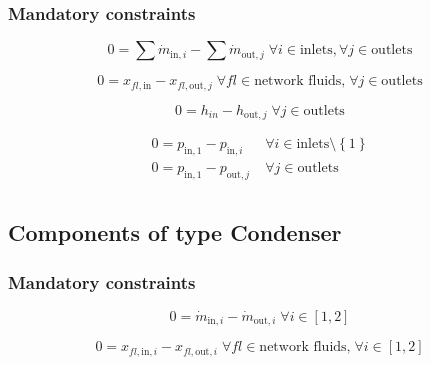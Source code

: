 \subsubsection{Mandatory constraints}

\begin{equation}
\label{eq:Splitter_mass_flow_constraints}
0 =\sum\dot{m}_{\mathrm{in},i}-\sum\dot{m}_{\mathrm{out},j}\;\forall i \in \text{inlets}, \forall j \in \text{outlets}
\end{equation}

\begin{equation}
\label{eq:Splitter_fluid_constraints}
0 = x_{fl\mathrm{,in}} - x_{fl\mathrm{,out,}j}\; \forall fl \in \text{network fluids,} \; \forall j \in\text{outlets}
\end{equation}

\begin{equation}
\label{eq:Splitter_energy_balance_constraints}
0=h_{in}-h_{\mathrm{out,}j}\;\forall j \in\text{outlets}
\end{equation}

\begin{equation}
\label{eq:Splitter_pressure_constraints}
\begin{split}
0 = p_\mathrm{in,1} - p_{\mathrm{in,}i} & \; \forall i \in \text{inlets} \setminus \left\lbrace 1\right\rbrace\\
0 = p_\mathrm{in,1} - p_{\mathrm{out,}j} & \; \forall j \in \text{outlets}\\
\end{split}
\end{equation}


\subsection{Components of type Condenser}

\subsubsection{Mandatory constraints}

\begin{equation}
\label{eq:Condenser_mass_flow_constraints}
0=\dot{m}_{\mathrm{in,}i}-\dot{m}_{\mathrm{out,}i}\; \forall i \in [1, 2]
\end{equation}

\begin{equation}
\label{eq:Condenser_fluid_constraints}
0=x_{fl\mathrm{,in,}i}-x_{fl\mathrm{,out,}i}\;\forall fl \in\text{network fluids,}\; \forall i \in [1, 2]
\end{equation}

